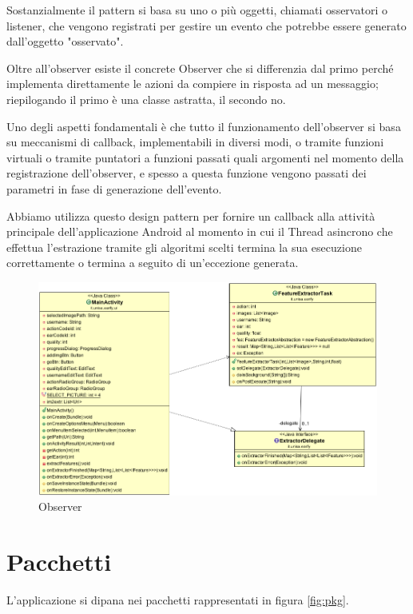 Sostanzialmente il pattern si basa su uno o più oggetti, chiamati osservatori o listener, che vengono registrati per gestire un evento che potrebbe essere generato dall'oggetto "osservato".

Oltre all'observer esiste il concrete Observer che si differenzia dal primo perché implementa direttamente le azioni da compiere in risposta ad un messaggio; riepilogando il primo è una classe astratta, il secondo no.

Uno degli aspetti fondamentali è che tutto il funzionamento dell'observer si basa su meccanismi di callback, implementabili in diversi modi, o tramite funzioni virtuali o tramite puntatori a funzioni passati quali argomenti nel momento della registrazione dell'observer, e spesso a questa funzione vengono passati dei parametri in fase di generazione dell'evento.

Abbiamo utilizza questo design pattern per fornire un callback alla attività principale dell'applicazione Android al momento in cui il Thread asincrono che effettua l'estrazione tramite gli algoritmi scelti termina la sua esecuzione correttamente o termina a seguito di un'eccezione generata.

\begin{figure}[ht]
	\centering
	\includegraphics[width=1.5\textwidth, angle=90]{img/delegation.png}
	\caption{Observer}\label{fig:delegation}
\end{figure}

\section{Pacchetti}
L'applicazione si dipana nei pacchetti rappresentati in figura \ref{fig:pkg}.

